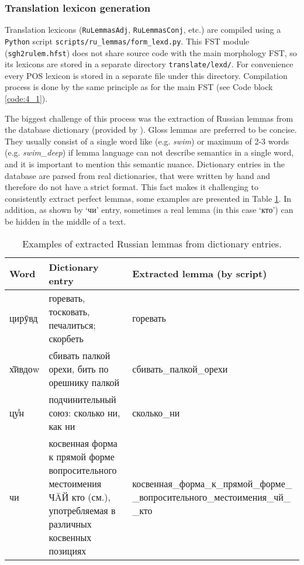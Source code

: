 \subsubsection*{Translation lexicon generation} \label{stem_lexicons}
Translation lexicons (\texttt{RuLemmasAdj}, \texttt{RuLemmasConj}, etc.) are compiled using a \texttt{Python} script \texttt{scripts/ru\_lemmas/form\_lexd.py}. This FST module (\texttt{sgh2rulem.hfst}) does not share source code with the main morphology FST, so its lexicons are stored in a separate directory \texttt{translate/lexd/}. For convenience every POS lexicon is stored in a separate file under this directory. Compilation process is done by the same principle as for the main FST (see Code block \ref{code:4_1}).

The biggest challenge of this process was the extraction of Russian lemmas from the database dictionary (provided by \textcite{makarov_digital_2022}). Gloss lemmas are preferred to be concise. They usually consist of a single word like (e.g. \textit{swim}) or maximum of 2-3 words (e.g. \textit{swim\_deep}) if lemma language can not describe semantics in a single word, and it is important to mention this semantic nuance. Dictionary entries in the database are parsed from real dictionaries, that were written by hand and therefore do not have a strict format. This fact makes it challenging to consistently extract perfect lemmas, some examples are presented in Table \ref{Tab:8_1}. In addition, as shown by `чи' entry, sometimes a real lemma (in this case `кто') can be hidden in the middle of a text. 

\begin{table}[!htbp]
    \begin{center}
        \begin{tabular}{|p{3cm}|p{5cm}|p{7cm}|}
            \hline
            \textbf{Word} & \textbf{Dictionary entry} & \textbf{Extracted lemma (by script)} \\
            \hline
            \hline
            цирӯвд & горевать, тосковать, печалиться; скорбеть & горевать \\
            \hline
            х̌ӣвдоw & сбивать палкой орехи, бить по орешнику палкой & сбивать\_палкой\_орехи \\
            \hline
            цу̊н & подчинительный союз: сколько ни, как ни & сколько\_ни \\
            \hline
            чи & косвенная форма к прямой форме вопросительного местоимения ЧĀЙ кто (см.), употребляемая в различных косвенных позициях & косвенная\_форма\_к\_прямой\_форме\_ \_вопросительного\_местоимения\_чй\_ \_кто \\
            \hline
        \end{tabular}
        \caption{Examples of extracted Russian lemmas from dictionary entries.}
        \label{Tab:8_1}
    \end{center}
\end{table}

